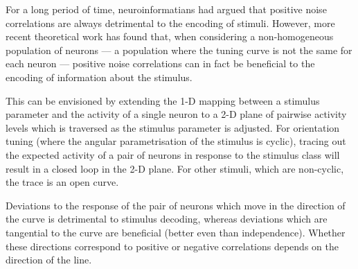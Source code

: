 For a long period of time, neuroinformatians had argued that positive noise correlations are always detrimental to the encoding of stimuli.
However, more recent theoretical work has found that, when considering a non-homogeneous population of neurons --- a population where the tuning curve is not the same for each neuron --- positive noise correlations can in fact be beneficial to the encoding of information about the stimulus.

This can be envisioned by extending the 1-D mapping between a stimulus parameter and the activity of a single neuron to a 2-D plane of pairwise activity levels which is traversed as the stimulus parameter is adjusted.
For orientation tuning (where the angular parametrisation of the stimulus is cyclic), tracing out the expected activity of a pair of neurons in response to the stimulus class will result in a closed loop in the 2-D plane.
For other stimuli, which are non-cyclic, the trace is an open curve.

Deviations to the response of the pair of neurons which move in the direction of the curve is detrimental to stimulus decoding, whereas deviations which are tangential to the curve are beneficial (better even than independence).
Whether these directions correspond to positive or negative correlations depends on the direction of the line.
